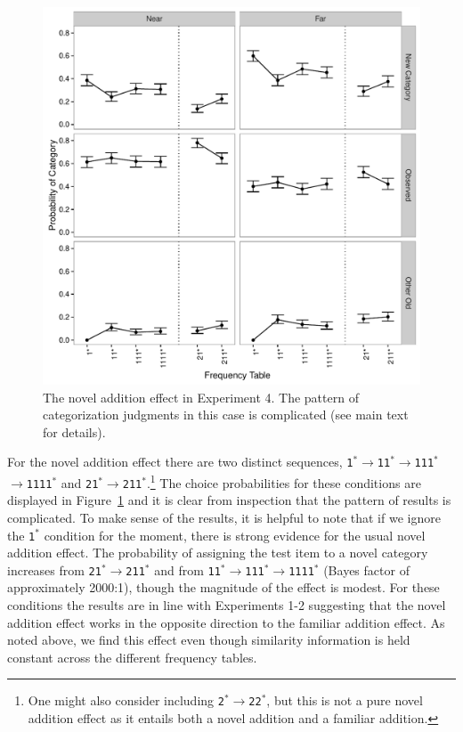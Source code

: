 \documentclass[doc]{apa6}
\newcommand{\dist}[1]{\texttt{#1}}
\newcommand{\goesto}{$\rightarrow$}
\begin{document}
\begin{figure}[t]
\begin{center}
\includegraphics[scale=.55]{exp4novel.pdf}
\caption{The novel addition effect in Experiment 4. The pattern of categorization judgments in this case is complicated (see main text for details).}
\label{fig:exp4novel}
\end{center}
\end{figure}

For the novel addition effect there are two distinct sequences, \dist{1$^*$}\goesto\dist{11$^*$}\goesto\dist{111$^*$}\goesto\dist{1111$^*$} and \dist{21$^*$}\goesto\dist{211$^*$}.\footnote{One might also consider including  \dist{2$^*$}\goesto\dist{22$^*$}, but this is not a pure novel addition effect as it entails both a novel addition and a familiar addition.} The choice probabilities for these conditions are displayed in Figure~\ref{fig:exp4novel} and it is clear from inspection that the pattern of results is complicated. To make sense of the results, it is helpful to note that if we ignore the \dist{1$^*$} condition for the moment, there is strong evidence for the usual novel addition effect. The probability of assigning the test item to a novel category increases from \dist{21$^*$}\goesto\dist{211$^*$} and from \dist{11$^*$}\goesto\dist{111$^*$}\goesto\dist{1111$^*$} (Bayes factor of approximately 2000:1), though the magnitude of the effect is modest. For these conditions the results are in line with Experiments 1-2 suggesting that the novel addition effect works in the opposite direction to the familiar addition effect. As noted above, we find this effect even though similarity information is held constant across the different frequency tables.
\end{document}
